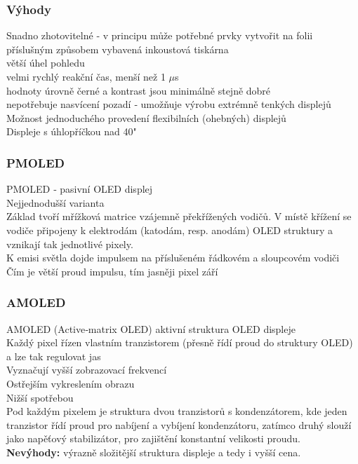 \subsubsection{Výhody}
Snadno zhotovitelné ‐ v principu může potřebné prvky vytvořit na
folii příslušným způsobem vybavená inkoustová tiskárna\\
větší úhel pohledu\\
velmi rychlý reakční čas, menší než 1 $\mu$s\\
hodnoty úrovně černé a kontrast jsou minimálně stejně dobré\\
nepotřebuje nasvícení pozadí ‐ umožňuje výrobu extrémně tenkých displejů\\
Možnost jednoduchého provedení flexibilních (ohebných) displejů\\
Displeje s úhlopříčkou nad 40"\\

\subsubsection{PMOLED}
PMOLED ‐ pasivní OLED displej\\
Nejjednodušší varianta\\
Základ tvoří mřížková matrice vzájemně překřížených vodičů. V místě křížení se vodiče připojeny k elektrodám (katodám, resp. anodám) OLED struktury a vznikají tak jednotlivé pixely.\\
K emisi světla dojde impulsem na příslušeném řádkovém a sloupcovém vodiči\\
Čím je větší proud impulsu, tím jasněji pixel září\\
\subsubsection{AMOLED}
AMOLED (Active‐matrix OLED) aktivní struktura OLED displeje\\
Každý pixel řízen vlastním tranzistorem (přesně řídí proud do struktury OLED) a lze tak regulovat jas\\
Vyznačují vyšší zobrazovací frekvencí\\
Ostřejším vykreslením obrazu\\
Nižší spotřebou\\
Pod každým pixelem je struktura dvou tranzistorů s kondenzátorem, kde jeden
tranzistor řídí proud pro nabíjení a vybíjení kondenzátoru, zatímco druhý slouží jako
napěťový stabilizátor, pro zajištění konstantní velikosti proudu.\\
\textbf{Nevýhody:} výrazně složitější struktura displeje a tedy i vyšší
cena.\\
\pagebreak
